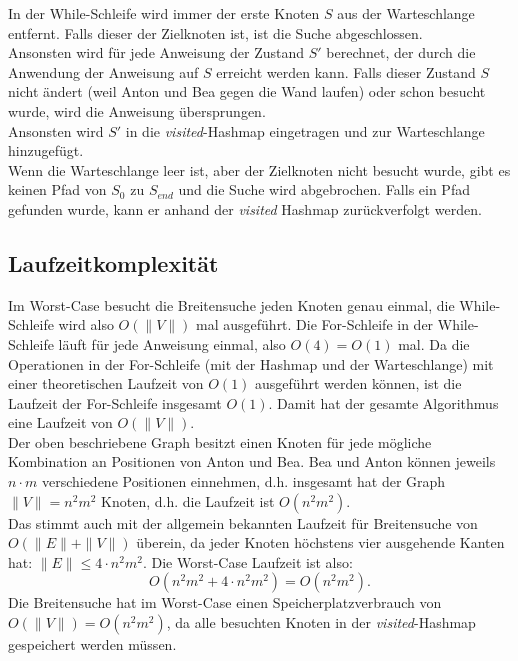 \documentclass[a4paper,10pt,ngerman]{scrartcl}
\begin{document}
    In der While-Schleife wird immer der erste Knoten $S$ aus der Warteschlange entfernt.
    Falls dieser der Zielknoten ist, ist die Suche abgeschlossen.\\
    Ansonsten wird für jede Anweisung der Zustand $S'$ berechnet, der durch die Anwendung der Anweisung auf $S$ erreicht werden kann.
    Falls dieser Zustand $S$ nicht ändert (weil Anton und Bea gegen die Wand laufen) oder schon besucht wurde, wird die Anweisung übersprungen.\\
    Ansonsten wird $S'$ in die \textit{visited}-Hashmap eingetragen und zur Warteschlange hinzugefügt.\\
    Wenn die Warteschlange leer ist, aber der Zielknoten nicht besucht wurde, gibt es keinen Pfad von $S_0$ zu $S_{end}$ und die Suche wird abgebrochen.
    Falls ein Pfad gefunden wurde, kann er anhand der \textit{visited} Hashmap zurückverfolgt werden.

    \subsection{Laufzeitkomplexität}
    Im Worst-Case besucht die Breitensuche jeden Knoten genau einmal, die While-Schleife wird also $O(\|V\|)$ mal ausgeführt.
    Die For-Schleife in der While-Schleife läuft für jede Anweisung einmal, also $O(4) = O(1)$ mal.
    Da die Operationen in der For-Schleife (mit der Hashmap und der Warteschlange) mit einer theoretischen Laufzeit von $O(1)$ ausgeführt werden können, ist die Laufzeit der For-Schleife insgesamt $O(1)$.
    Damit hat der gesamte Algorithmus eine Laufzeit von $O(\|V\|)$. \\
    Der oben beschriebene Graph besitzt einen Knoten für jede mögliche Kombination an Positionen von Anton und Bea.
    Bea und Anton können jeweils $n \cdot m$ verschiedene Positionen einnehmen, d.h. insgesamt hat der Graph $\|V\| = n^2 m^2$ Knoten, d.h. die Laufzeit ist $O(n^2 m^2)$. \\
    Das stimmt auch mit der allgemein bekannten Laufzeit für Breitensuche von $O(\|E\| + \|V\|)$ überein, da jeder Knoten höchstens vier ausgehende Kanten hat: $\|E\| \le 4 \cdot n ^2 m^2$.
    Die Worst-Case Laufzeit ist also: \[O(n^2 m^2 + 4 \cdot n^2 m^2) = O(n^2 m^2).\]
    Die Breitensuche hat im Worst-Case einen Speicherplatzverbrauch von $O(\|V\|) =  O(n^2 m^2)$, da alle besuchten Knoten in der \textit{visited}-Hashmap gespeichert werden müssen.
\end{document}
